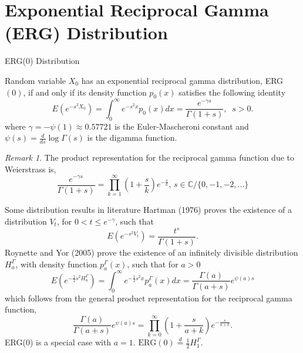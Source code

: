 \documentclass[10pt]{beamer}
\theoremstyle{remark}
\newtheorem*{remark}{Remark}
\theoremstyle{definition}
\begin{document}
\section{Exponential Reciprocal Gamma (ERG) Distribution}
\begin{frame}{ERG(0) Distribution}
\begin{definition}
	Random variable $X_0$ has an exponential reciprocal gamma distribution, ERG$(0)$, if and only if its density function $p_0(x)$ satisfies the following identity
	\begin{equation*}
	E\left( e^{-s^2 X_0}\right) = \int_{0}^\infty e^{- s^2x} p_0(x) d x = \frac{e^{-\gamma s}}{\Gamma(1+s)} , \; \; s > 0 .
	\end{equation*}
	where $\gamma = -\psi(1) \approx 0.57721$ is the Euler-Mascheroni constant and $\psi(s) = \frac{d}{ds}\log\Gamma(s)$ is the digamma function. 
\end{definition}
\begin{remark}
	\label{rmk:remark_1}
	The product representation for the reciprocal gamma function due to Weierstrass is,
	$$
	\frac{e^{-\gamma s}}{\Gamma(1+s)} = \prod_{k=1}^\infty \left(1 + \frac{s}{k}\right) e^{-\frac{s}{k}}, \, s \in \mathbb{C}\slash \{0, -1, -2, ...\}
	$$
\end{remark}
\end{frame}

\begin{frame}{Some distribution results in literature}
Hartman (1976) proves the existence of a distribution $V_t$, for $0 < t \leq e^{-\gamma}$, such that 
\begin{equation*}
E\left(e^{-s^2V_t}\right) = \frac{t^s}{\Gamma(1+s)}.
\end{equation*}
Roynette and Yor (2005) prove the existence of an infinitely divisible distribution $H_a^\Gamma $, with density function  $  p_a^\Gamma  ( x )$, such that for $a>0$
$$
E\left( e^{-\frac{1}{2}s^2 H_a^\Gamma}\right) = \int_0^\infty e^{-\frac{1}{2} s^2 x} p_a^\Gamma  ( x ) dx =\frac{\Gamma(a)}{\Gamma(a+s)} e^{\psi(a)s} 
$$
which follows from the general product representation for the reciprocal gamma function, 
\begin{equation*}
\frac{\Gamma(a)}{\Gamma\left(a + s\right)} e^{\psi(a)s} =\prod_{k=0}^{\infty}\left( 1 + \frac{s}{a+ k} \right)e^{-\frac{s}{a+k}}.
\end{equation*}
ERG(0) is a special case with $a = 1$. $\text{ERG}(0) \overset{d}{=} \frac{1}{2} H_1^\Gamma.$
\end{frame}
\end{document}
